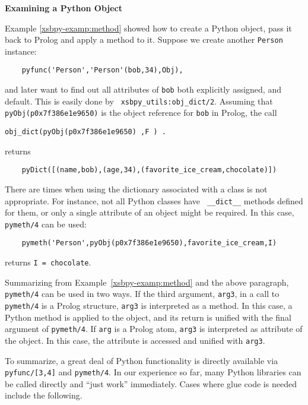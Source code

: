 \begin{example} \rm {\bf Examining a Python Object} \label{xsbpy-examp:exam-object}

\noindent
Example \ref{xsbpy-examp:method} showed how to create a Python object,
pass it back to Prolog and apply a method to it.  Suppose we create
another {\tt Person} instance:

\begin{verbatim}
    pyfunc('Person','Person'(bob,34),Obj),
\end{verbatim}
\noindent
and later want to find out all attributes of {\tt bob} both explicitly
assigned, and default.  This is easily done by {\tt
  xsbpy\_utils:obj\_dict/2}.  Assuming that {\tt
  pyObj(p0x7f386e1e9650)} is the object reference for {\tt bob} in
Prolog, the call
\begin{verbatim}
obj_dict(pyObj(p0x7f386e1e9650) ,F ) .
\end{verbatim}
returns
\begin{verbatim}
    pyDict([(name,bob),(age,34),(favorite_ice_cream,chocolate)])
\end{verbatim}

There are times when using the dictionary associated with a class is
not appropriate.  For instance, not all Python classes have {\tt
  \_\_dict\_\_} methods defined for them, or only a single attribute
of an object might be required.  In this case, {\tt pymeth/4} can be
used:

\begin{verbatim}
    pymeth('Person',pyObj(p0x7f386e1e9650),favorite_ice_cream,I)
\end{verbatim}
\noindent
returns {\tt I = chocolate}.

Summarizing from Example~\ref{xsbpy-examp:method} and the above
paragraph, {\tt pymeth/4} can be used in two ways.  If the third
argument, {\tt arg3}, in a call to {\tt pymeth/4} is a Prolog
structure, {\tt arg3} is interpreted as a method.  In this case, a
Python method is applied to the object, and its return is unified with
the final argument of {\tt pymeth/4}. If {\tt arg} is a Prolog atom,
{\tt arg3} is interpreted as attribute of the object.  In this case,
the attribute is accessed and unified with {\tt arg3}.
\end{example}

To summarize, a great deal of Python functionality is directly
available via {\tt pyfunc/[3,4]} and {\tt pymeth/4}.  In our
experience so far, many Python libraries can be called directly and
``just work'' immediately.  Cases where glue code is needed include
the following.


